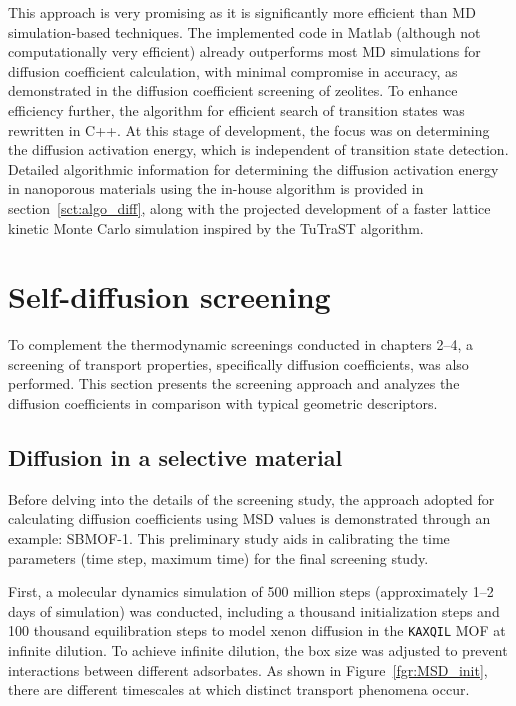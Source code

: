 \documentclass[main]{subfiles}
\begin{document}
This approach is very promising as it is significantly more efficient than MD simulation-based techniques. The implemented code in Matlab (although not computationally very efficient) already outperforms most MD simulations for diffusion coefficient calculation, with minimal compromise in accuracy, as demonstrated in the diffusion coefficient screening of zeolites. To enhance efficiency further, the algorithm for efficient search of transition states was rewritten in C++. At this stage of development, the focus was on determining the diffusion activation energy, which is independent of transition state detection. Detailed algorithmic information for determining the diffusion activation energy in nanoporous materials using the in-house algorithm is provided in section~\ref{sct:algo_diff}, along with the projected development of a faster lattice kinetic Monte Carlo simulation inspired by the TuTraST algorithm.


\section{Self-diffusion screening}\label{sct:md_screening}

To complement the thermodynamic screenings conducted in chapters 2--4, a screening of transport properties, specifically diffusion coefficients, was also performed. This section presents the screening approach and analyzes the diffusion coefficients in comparison with typical geometric descriptors.

\subsection{Diffusion in a selective material}

Before delving into the details of the screening study, the approach adopted for calculating diffusion coefficients using MSD values is demonstrated through an example: SBMOF-1\autocite{Banerjee_2016}. This preliminary study aids in calibrating the time parameters (time step, maximum time) for the final screening study.

First, a molecular dynamics simulation of 500 million steps (approximately 1--2 days of simulation) was conducted, including a thousand initialization steps and 100 thousand equilibration steps to model xenon diffusion in the \texttt{KAXQIL}\autocite{Banerjee2012} MOF at infinite dilution. To achieve infinite dilution, the box size was adjusted to prevent interactions between different adsorbates. As shown in Figure~\ref{fgr:MSD_init}, there are different timescales at which distinct transport phenomena occur. 
\end{document}
